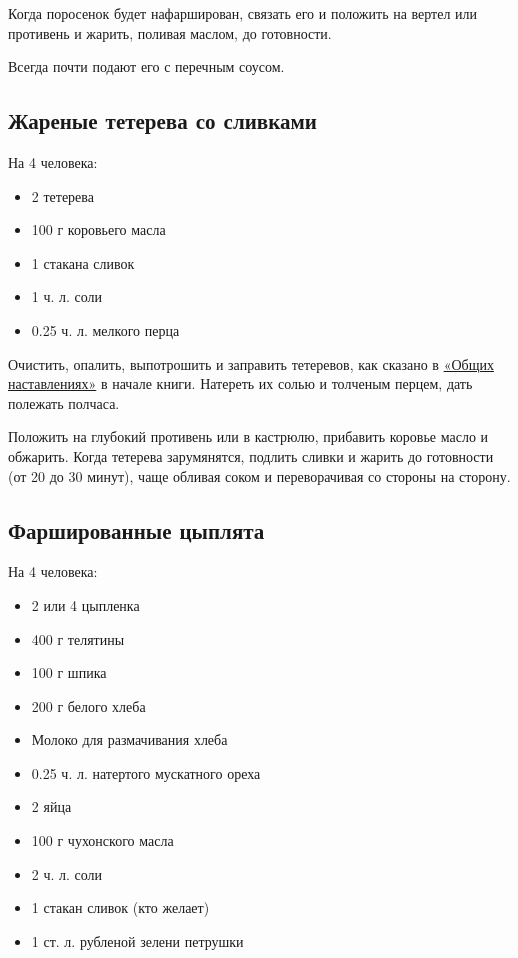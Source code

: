 Когда поросенок будет нафарширован, связать его и положить на вертел или противень и жарить, поливая маслом, до готовности.

Всегда почти подают его с перечным соусом.

\subsection{Жареные тетерева со сливками}

На 4 человека:

\begin{itemize} 
	\item  2 тетерева 
    \item 100 г коровьего масла 
    \item 1 стакана сливок 
    \item 1 ч. л. соли 
    \item 0.25 ч. л. мелкого перца
\end{itemize}

Очистить, опалить, выпотрошить и заправить тетеревов, как сказано в \hyperref[0sec:obsch-nast]{«Общих наставлениях»} в начале книги. Натереть их солью и толченым перцем, дать полежать полчаса.

Положить на глубокий противень или в кастрюлю, прибавить коровье масло и обжарить. Когда тетерева зарумянятся, подлить сливки и жарить до готовности (от 20 до 30 минут), чаще обливая соком и переворачивая со стороны на сторону.

\subsection{Фаршированные цыплята}

На 4 человека:

\begin{itemize} 	
	\item  2 или 4 цыпленка 
    \item 400 г телятины 
    \item 100 г шпика 
    \item 200 г белого хлеба 
    \item Молоко для размачивания хлеба 
    \item 0.25 ч. л. натертого мускатного ореха 
    \item 2 яйца 
    \item 100 г чухонского масла 
    \item 2 ч. л. соли 
    \item 1 стакан сливок (кто желает) 
    \item 1 ст. л. рубленой зелени петрушки
\end{itemize}

